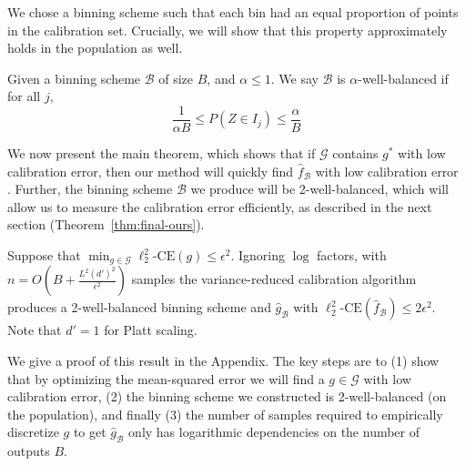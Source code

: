 


We chose a binning scheme such that each bin had an equal proportion of points in the calibration set. Crucially, we will show that this property approximately holds in the population as well.

\begin{definition}
Given a binning scheme $\mathcal{B}$ of size $B$, and $\alpha \leq 1$. We say $\mathcal{B}$ is $\alpha$-well-balanced if for all $j$,
\[ \frac{1}{\alpha B} \leq P(Z \in I_j) \leq \frac{\alpha}{B}\]
\end{definition}

We now present the main theorem, which shows that if $\mathcal{G}$ contains $g^*$ with low calibration error, then our method will quickly find $\hat{f}_{\mathcal{B}}$ with low calibration error . Further, the binning scheme $\mathcal{B}$ we produce will be 2-well-balanced, which will allow us to measure the calibration error efficiently, as described in the next section (Theorem~\ref{thm:final-ours}).

\begin{theorem}
\label{thm:final-calib}
Suppose that $\min_{g \in \mathcal{G}}\ell_2^2\mbox{-CE}(g) \leq \epsilon^2$.
  Ignoring $\log$ factors, with $n = O(B + \frac{L^2 (d')^2}{\epsilon^2})$  samples the variance-reduced calibration algorithm produces a 2-well-balanced binning scheme and $\hat{g}_{\mathcal{B}}$ with $\ell_2^2\mbox{-CE}(\hat{f}_{\mathcal{B}}) \leq 2 \epsilon^2$. Note that $d' = 1$ for Platt scaling.
\end{theorem}

We give a proof of this result in the Appendix. The key steps are to (1) show that by optimizing the mean-squared error we will find a $g \in \mathcal{G}$ with low calibration error, (2) the binning scheme we constructed is 2-well-balanced (on the population), and finally (3) the number of samples required to empirically discretize $g$ to get $\hat{g}_{\mathcal{B}}$ only has logarithmic dependencies on the number of outputs $B$.

